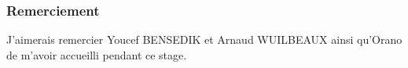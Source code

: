 

\begin{center}

    \subsubsection*{Remerciement}
J'aimerais remercier Youcef BENSEDIK et Arnaud WUILBEAUX ainsi qu’Orano  de m'avoir accueilli pendant ce stage. 
\end{center}


\begin{abstract}
    \lipsum[1]
\end{abstract}
    

\begin{adjustwidth}{30pt}{30pt}
\end{adjustwidth}

\tableofcontents
\listoffigures
\clearpage